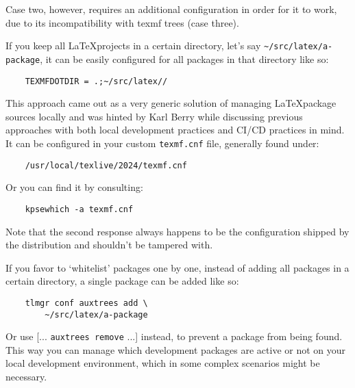 \documentclass{xdpdoc}
\begin{document}
\begin{multicols}{2}
        Case two, however, requires an additional configuration in order for it to work, due to its incompatibility with texmf trees (case three).\\
        \label{fig:project dir}\bigskip

        If you keep all \LaTeX projects in a certain directory, let's say \texttt{\textasciitilde/src/latex/a-package}, it can be easily configured for all packages in that directory like so:
        \begin{lstlisting}
    TEXMFDOTDIR = .;~/src/latex//
        \end{lstlisting}
        This approach came out as a very generic solution of managing \LaTeX package sources locally and was hinted by Karl Berry while discussing previous approaches with both local development practices and CI/CD practices in mind.
        It can be configured in your custom \texttt{texmf.cnf} file, generally found under:
        \begin{lstlisting}
    /usr/local/texlive/2024/texmf.cnf
        \end{lstlisting}
        Or you can find it by consulting:
        \begin{lstlisting}
    kpsewhich -a texmf.cnf
        \end{lstlisting}
        Note that the second response always happens to be the configuration shipped by the \TeXLive distribution and shouldn't be tampered with.

        If you favor to `whitelist' packages one by one, instead of adding all packages in a certain directory, a single package can be added like so:
        \begin{lstlisting}
    tlmgr conf auxtrees add \
        ~/src/latex/a-package
        \end{lstlisting}
        Or use [... \texttt{auxtrees remove} ...] instead, to prevent a package from being found.
        This way you can manage which development packages are active or not on your local development environment, which in some complex scenarios might be necessary.


\end{multicols}
\end{document}
